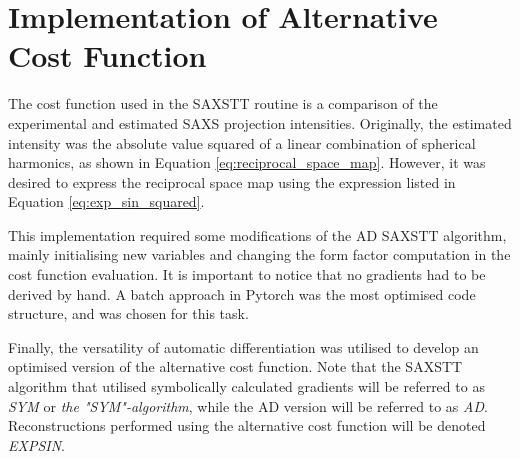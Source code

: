 \section{Implementation of Alternative Cost Function}\label{sec:alternative_cost_function}

The cost function used in the SAXSTT routine is a comparison of the experimental and estimated SAXS projection intensities.
Originally, the estimated intensity was the absolute value squared of a linear combination of spherical harmonics, as shown in Equation \eqref{eq:reciprocal_space_map}.
However, it was desired to express the reciprocal space map using the expression listed in Equation \eqref{eq:exp_sin_squared}.

\noindent
This implementation required some modifications of the AD SAXSTT algorithm, mainly initialising new variables and changing the form factor computation in the cost function evaluation.
It is important to notice that no gradients had to be derived by hand.
A batch approach in Pytorch was the most optimised code structure, and was chosen for this task.

Finally, the versatility of automatic differentiation was utilised to develop an optimised version of the alternative cost function.
Note that the SAXSTT algorithm that utilised symbolically calculated gradients will be referred to as \emph{SYM} or \emph{the "SYM"-algorithm},
while the AD version will be referred to as \emph{AD}. Reconstructions performed using the alternative cost function will be denoted \emph{EXPSIN}.




